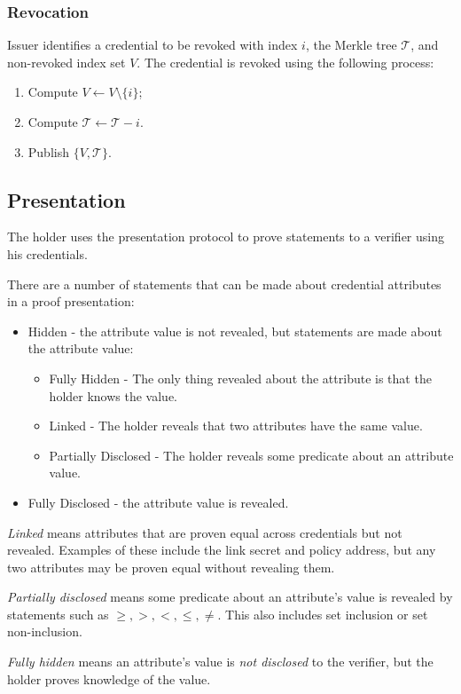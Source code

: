 \documentclass[a4paper]{article}
\begin{document}
\subsubsection{Revocation}
Issuer identifies a credential to be revoked with index $i$, the Merkle tree $\mathcal{T}$, and non-revoked index set $V$. The credential is revoked using the following process:
\begin{enumerate}
\item Compute $V\leftarrow V\setminus\{i\}$;
\item Compute $\mathcal{T} \leftarrow \mathcal{T} - i$.
\item Publish $\{V,\mathcal{T}\}$.
\end{enumerate}

\subsection{Presentation}
The holder uses the presentation protocol to prove statements to a verifier using his credentials.

There are a number of statements that can be made about credential attributes in a proof presentation:
\begin{itemize}
    \item Hidden - the attribute value is not revealed, but statements are made about the attribute value:
    \begin{itemize}
        \item Fully Hidden - The only thing revealed about the attribute is that the holder knows the value.
        \item Linked - The holder reveals that two attributes have the same value.
        \item Partially Disclosed - The holder reveals some predicate about an attribute value.
    \end{itemize}
    \item Fully Disclosed - the attribute value is revealed.
\end{itemize}
\emph{Linked} means attributes that are proven equal across credentials but not revealed. Examples of these include the link secret and policy address, but any two attributes may be proven equal without revealing them.

\emph{Partially disclosed} means some predicate about an attribute's value is revealed by statements such as $\geq, >, <, \leq, \neq$. This also includes set inclusion or set non-inclusion.

\emph{Fully hidden} means an attribute's value is \emph{not disclosed} to the verifier, but the holder proves knowledge of the value.
\end{document}
